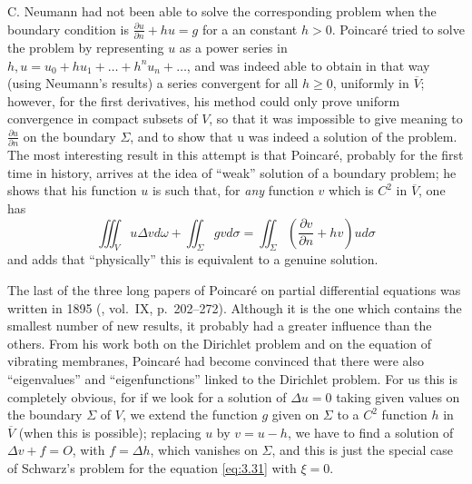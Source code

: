 \documentclass[12pt,a4paper,leqno,twoside]{extbook}
\newcommand{\pder}[2]{\frac{\partial #1}{\partial #2}}
\begin{document}
C. Neumann had not been able to solve the corresponding problem when the boundary condition is \(\pder{u}{n} + hu = g\) for a an constant \(h > 0\). Poincaré tried to solve the problem by representing \(u\) as a power series in \(h, u = u_0 + h u_1 + \ldots + h^n u_n + \ldots\), and was indeed able to obtain in that way (using Neumann's results) a series convergent for all \(h \geq 0\), uniformly in \(\overline{V}\); however, for the first derivatives, his method could only prove uniform convergence in compact subsets of \(V\), so that it was impossible to give meaning to \(\pder{u}{n}\) on the boundary \(\Sigma\), and to show that u was indeed a solution of the problem. The most interesting result in this attempt is that Poincaré, probably for the first time in history, arrives at the idea of ``weak'' solution of a boundary problem; he shows that his function \(u\) is such that, for \emph{any} function \(v\) which is \(C^2\) in \(\overline{V}\), one has
\begin{equation}
    \label{eq:3.37}
    \iiint_V u\Delta v d\omega + \iint_\Sigma gv d\sigma = \iint_\Sigma \left( \pder{v}{n} + hv \right) u d\sigma
\end{equation}
and adds that ``physically'' this is equivalent to a genuine solution.

The last of the three long papers of Poincaré on partial differential equations was written in 1895 (\cite{177}, vol.~IX, p.~202--272). Although it is the one which contains the smallest number of new results, it probably had a greater influence than the others. From his work both on the Dirichlet problem and on the equation of vibrating membranes, Poincaré had become convinced that there were also ``eigenvalues'' and ``eigenfunctions'' linked to the Dirichlet problem. For us this is completely obvious, for if we look for a solution of \(\Delta u = 0\) taking given values on the boundary \(\Sigma\) of \(V\), we extend the function \(g\) given on \(\Sigma\) to a \(C^2\) function \(h\) in \(\overline{V}\) (when this is possible); replacing \(u\) by \(v = u-h\), we have to find a solution of \(\Delta v + f = O\), with \(f = \Delta h\), which vanishes on \(\Sigma\), and this is just the special case of Schwarz's problem for the equation \eqref{eq:3.31} with \(\xi = 0\).
\end{document}
